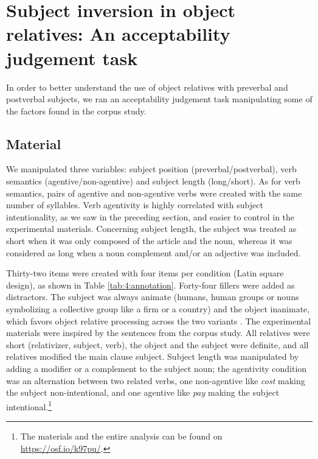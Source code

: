 \documentclass[output=paper]{langscibook}
\begin{document}
\section{Subject inversion in object relatives: An acceptability judgement task}

In order to better understand the use of object relatives with
preverbal and post\-verbal subjects, we ran an acceptability judgement
task manipulating some of the factors found in the corpus study.

\subsection{Material}


We manipulated three variables: subject position
(preverbal/postverbal), verb semantics (agentive/non-agentive) and
subject length (long/short). As for verb semantics, pairs of agentive
and non-agentive verbs were created with the same number of
syllables. Verb agentivity is highly correlated with subject
intentionality, as we saw in the preceding section, and easier to
control in the experimental materials. Concerning subject length, the
subject was treated as short when it was only composed of the article and the
noun, whereas it was considered as long when a noun complement and/or
an adjective was included.

Thirty-two items were created with four items per condition (Latin
square design), as shown in Table \ref{tab:4:annotation}. Forty-four
fillers were added as distractors. The subject was always animate
(humans, human groups or nouns symbolizing a collective group like a
firm or a country) and the object inanimate, which favors object
relative processing across the two variants \citep{Frauenfelder1980,
  mak2006animacy}. The experimental materials were inspired by the
sentences from the corpus study. All relatives were short
(relativizer, subject, verb), the object and the subject were
definite, and all relatives modified the main clause subject. Subject
length was manipulated by adding a modifier or a complement to the
subject noun; the agentivity condition was an alternation between two
related verbs, one non-agentive like {\textit{cost}} making the
subject non-intentional, and one agentive like \textit{pay} making the
subject intentional.\footnote{The materials and the entire analysis
  can be found on \url{https://osf.io/k97pu/}.}
\end{document}
